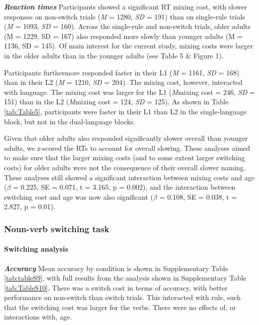\documentclass[
]{article}
\begin{document}
\textbf{\emph{Reaction times}}
Participants showed a significant RT mixing cost, with slower responses on non-switch trials (\emph{M} = 1280, \emph{SD} = 191) than on single-rule trials (\emph{M} = 1093, \emph{SD} = 160). Across the single-rule and non-switch trials, older adults (M = 1229, SD = 167) also responded more slowly than younger adults (M = 1136, SD = 145). Of main interest for the current study, mixing costs were larger in the older adults than in the younger adults (see Table 5 \& Figure 1).

Participants furthermore responded faster in their L1 (\emph{M} = 1161, \emph{SD} = 168) than in their L2 (\emph{M} = 1210, \emph{SD} = 204). The mixing cost, however, interacted with language. The mixing cost was larger for the L1 (\emph{M}mixing cost = 246, \emph{SD} = 151) than in the L2 (\emph{M}mixing cost = 124, \emph{SD} = 125). As shown in Table \ref{tab:Table5}, participants were faster in their L1 than L2 in the single-language block, but not in the dual-language blocks.

Given that older adults also responded significantly slower overall than younger adults, we z-scored the RTs to account for overall slowing. These analyses aimed to make sure that the larger mixing costs (and to some extent larger switching costs) for older adults were not the consequence of their overall slower naming. These analyses still showed a significant interaction between mixing costs and age (\(\beta\) = 0.225, SE = 0.071, t = 3.165, p = 0.002), and the interaction between switching cost and age was now also significant (\(\beta\) = 0.108, SE = 0.038, t = 2.827, p = 0.01).

\hypertarget{noun-verb-switching-task}{%
\subsubsection{Noun-verb switching task}\label{noun-verb-switching-task}}

\hypertarget{switching-analysis-1}{%
\paragraph{Switching analysis}\label{switching-analysis-1}}

\hfill\break

\textbf{\emph{Accuracy}}
Mean accuracy by condition is shown in Supplementary Table \ref{tab:tableS9}, with full results from the analysis shown in Supplementary Table \ref{tab:TableS10}. There was a switch cost in terms of accuracy, with better performance on non-switch than switch trials. This interacted with rule, such that the switching cost was larger for the verbs. There were no effects of, or interactions with, age.
\end{document}

